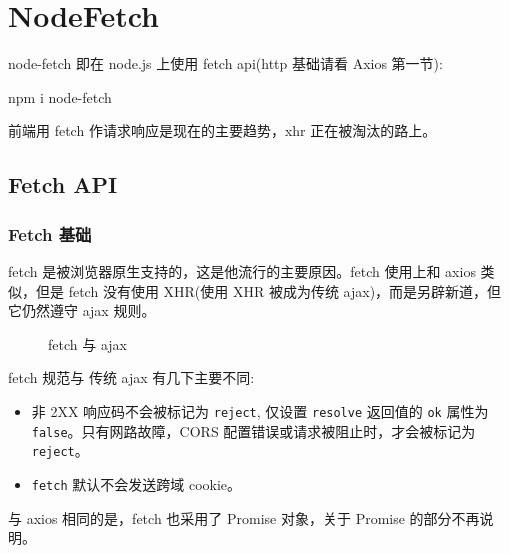 \section{NodeFetch}

node-fetch 即在 node.js 上使用 fetch api(http 基础请看 Axios 第一节):

\begin{bash}
npm i node-fetch
\end{bash}

前端用 fetch 作请求响应是现在的主要趋势，xhr 正在被淘汰的路上。

\subsection{Fetch API}

\subsubsection{Fetch 基础}

fetch 是被浏览器原生支持的，这是他流行的主要原因。fetch 使用上和 axios 类似，但是 fetch 没有使用 XHR(使用 XHR 被成为传统 ajax)，而是另辟新道，但它仍然遵守 ajax 规则。

\begin{figure}[H]
  \small
  \centering
  \caption{fetch 与 ajax}
  \label{fig:fetch 与 ajax}
\end{figure}

fetch 规范与 传统 ajax 有几下主要不同:
\begin{itemize}
  \item 非 2XX 响应码不会被标记为 \texttt{reject}, 仅设置 \texttt{resolve} 返回值的 \texttt{ok} 属性为 \texttt{false}。只有网路故障，CORS 配置错误或请求被阻止时，才会被标记为 \texttt{reject}。
  \item \texttt{fetch} 默认不会发送跨域 cookie。
\end{itemize}

与 axios 相同的是，fetch 也采用了 Promise 对象，关于 Promise 的部分不再说明。

